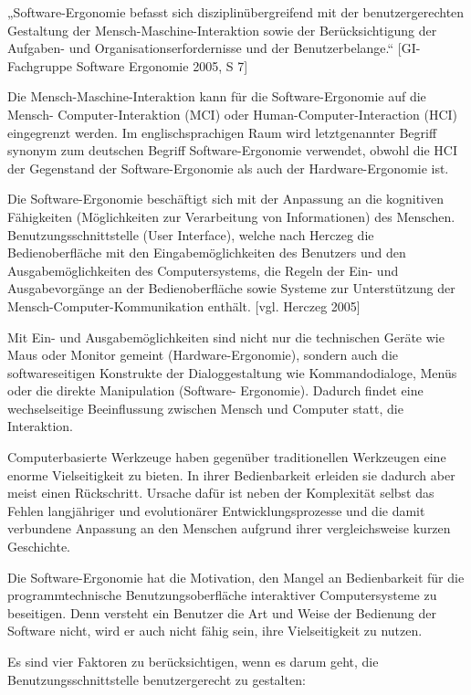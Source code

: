 \documentclass[a4paper, 12pt, twoside, BCOR=20mm, DIV=calc, abstracton, parskip=half*, toc=bibliography, toc=listof, headsepline, footsepline, headings=small, numbers=enddot]{scrreprt}
\begin{document}
„Software-Ergonomie befasst sich disziplinübergreifend mit der benutzergerechten Gestaltung der Mensch-Maschine-Interaktion sowie der Berücksichtigung der Aufgaben- und Organisationserfordernisse und der Benutzerbelange.“ [GI-Fachgruppe Software Ergonomie 2005, S 7]

Die Mensch-Maschine-Interaktion kann für die Software-Ergonomie auf die Mensch- Computer-Interaktion (MCI) oder Human-Computer-Interaction (HCI) eingegrenzt werden. Im englischsprachigen Raum wird letztgenannter Begriff synonym zum deutschen Begriff Software-Ergonomie verwendet, obwohl die HCI der Gegenstand der Software-Ergonomie als auch der Hardware-Ergonomie ist.

Die Software-Ergonomie beschäftigt sich mit der Anpassung an die kognitiven Fähigkeiten (Möglichkeiten zur Verarbeitung von Informationen) des Menschen. Benutzungsschnittstelle (User Interface), welche nach Herczeg die Bedienoberfläche mit den Eingabemöglichkeiten des Benutzers und den Ausgabemöglichkeiten des Computersystems, die Regeln der Ein- und Ausgabevorgänge an der Bedienoberfläche sowie  Systeme zur Unterstützung der Mensch-Computer-Kommunikation enthält. [vgl. Herczeg 2005]

Mit Ein- und Ausgabemöglichkeiten sind nicht nur die technischen Geräte wie Maus oder Monitor gemeint (Hardware-Ergonomie), sondern auch die softwareseitigen Konstrukte der Dialoggestaltung wie Kommandodialoge, Menüs oder die direkte Manipulation (Software- Ergonomie). Dadurch findet eine wechselseitige Beeinflussung zwischen Mensch und Computer statt, die Interaktion.

Computerbasierte Werkzeuge haben gegenüber traditionellen Werkzeugen eine enorme Vielseitigkeit zu bieten. In ihrer Bedienbarkeit erleiden sie dadurch aber meist einen Rückschritt. Ursache dafür ist neben der Komplexität selbst das Fehlen langjähriger und evolutionärer Entwicklungsprozesse und die damit verbundene Anpassung an den Menschen aufgrund ihrer vergleichsweise kurzen Geschichte.

Die Software-Ergonomie hat die Motivation, den Mangel an Bedienbarkeit für die programmtechnische Benutzungsoberfläche interaktiver Computersysteme zu beseitigen. Denn versteht ein Benutzer die Art und Weise der Bedienung der Software nicht, wird er auch nicht fähig sein, ihre Vielseitigkeit zu nutzen.

Es sind vier Faktoren zu berücksichtigen, wenn es darum geht, die Benutzungsschnittstelle benutzergerecht zu gestalten:
\end{document}
